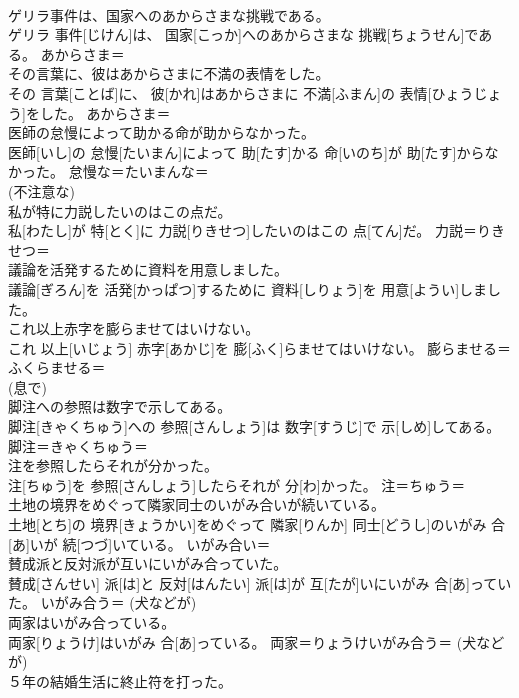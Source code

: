 \documentclass[8pt]{extreport}
\begin{document}
\begin{CJK}{UTF8}{min}
\\	ゲリラ事件は、国家へのあからさまな挑戦である。	
\\	ゲリラ 事件[じけん]は、 国家[こっか]へのあからさまな 挑戦[ちょうせん]である。	あからさま＝ 
\\	その言葉に、彼はあからさまに不満の表情をした。	
\\	その 言葉[ことば]に、 彼[かれ]はあからさまに 不満[ふまん]の 表情[ひょうじょう]をした。	あからさま＝ 
\\	医師の怠慢によって助かる命が助からなかった。	
\\	医師[いし]の 怠慢[たいまん]によって 助[たす]かる 命[いのち]が 助[たす]からなかった。	怠慢な＝たいまんな＝ 
\\	(不注意な) 
\\	私が特に力説したいのはこの点だ。	
\\	私[わたし]が 特[とく]に 力説[りきせつ]したいのはこの 点[てん]だ。	力説＝りきせつ＝ 
\\	議論を活発するために資料を用意しました。	
\\	議論[ぎろん]を 活発[かっぱつ]するために 資料[しりょう]を 用意[ようい]しました。	
\\	これ以上赤字を膨らませてはいけない。	
\\	これ 以上[いじょう] 赤字[あかじ]を 膨[ふく]らませてはいけない。	膨らませる＝ふくらませる＝ 
\\	(息で)
\\	脚注への参照は数字で示してある。	
\\	脚注[きゃくちゅう]への 参照[さんしょう]は 数字[すうじ]で 示[しめ]してある。	脚注＝きゃくちゅう＝ 
\\	注を参照したらそれが分かった。	
\\	注[ちゅう]を 参照[さんしょう]したらそれが 分[わ]かった。	注＝ちゅう＝ 
\\	土地の境界をめぐって隣家同士のいがみ合いが続いている。	
\\	土地[とち]の 境界[きょうかい]をめぐって 隣家[りんか] 同士[どうし]のいがみ 合[あ]いが 続[つづ]いている。	いがみ合い＝ 
\\	賛成派と反対派が互いにいがみ合っていた。	
\\	賛成[さんせい] 派[は]と 反対[はんたい] 派[は]が 互[たが]いにいがみ 合[あ]っていた。	いがみ合う＝ (犬などが) 
\\	両家はいがみ合っている。	
\\	両家[りょうけ]はいがみ 合[あ]っている。	両家＝りょうけいがみ合う＝ (犬などが) 
\\	５年の結婚生活に終止符を打った。	

\end{CJK}
\end{document}
